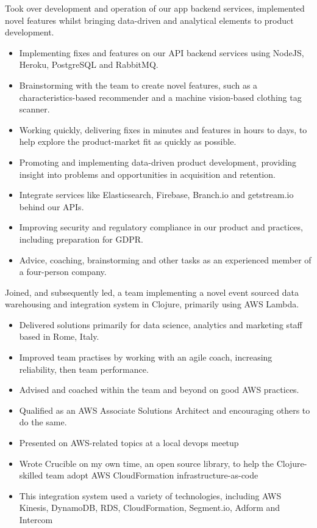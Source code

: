 \documentclass[11pt,a4paper,sans]{moderncv}        %
\begin{document}
{Took over development and operation of our app backend services, implemented novel features whilst bringing data-driven and analytical elements to product development.
\newline{}
\begin{itemize}
\item Implementing fixes and features on our API backend services using NodeJS, Heroku, PostgreSQL and RabbitMQ.
\item Brainstorming with the team to create novel features, such as a characteristics-based recommender and a machine vision-based clothing tag scanner.
\item Working quickly, delivering fixes in minutes and features in hours to days, to help explore the product-market fit as quickly as possible.
\item Promoting and implementing data-driven product development, providing insight into problems and opportunities in acquisition and retention.
\item Integrate services like Elasticsearch, Firebase, Branch.io and getstream.io behind our APIs.
\item Improving security and regulatory compliance in our product and practices, including preparation for GDPR.
\item Advice, coaching, brainstorming and other tasks as an experienced member of a four-person company.
\end{itemize}
}

{Joined, and subsequently led, a team implementing a novel event sourced data warehousing and integration system in Clojure, primarily using AWS Lambda.
\newline{}
\begin{itemize}
\item Delivered solutions primarily for data science, analytics and marketing staff based in Rome, Italy.
\item Improved team practises by working with an agile coach, increasing reliability, then team performance.
\item Advised and coached within the team and beyond on good AWS practices.
\item Qualified as an AWS Associate Solutions Architect and encouraging others to do the same.
\item Presented on AWS-related topics at a local devops meetup
\item Wrote Crucible on my own time, an open source library, to help the Clojure-skilled team adopt AWS CloudFormation infrastructure-as-code
\item This integration system used a variety of technologies, including AWS Kinesis, DynamoDB, RDS, CloudFormation, Segment.io, Adform and  Intercom
\end{itemize}
}
\end{document}
